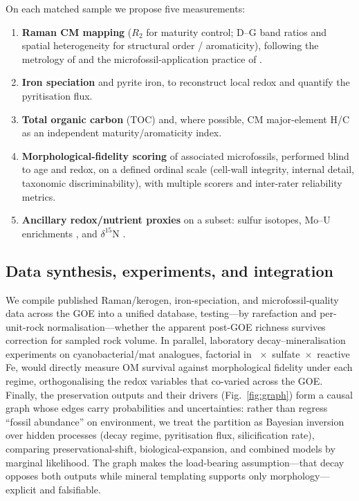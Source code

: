 \documentclass[11pt]{article}
\begin{document}
On each matched sample we propose five measurements:
\begin{enumerate}\itemsep0pt
\item \textbf{Raman CM mapping} ($R_2$ for maturity control; D--G band ratios and spatial
heterogeneity for structural order / aromaticity), following the metrology of \citet{Beyssac2002}
and the microfossil-application practice of \citet{Qu2019}.
\item \textbf{Iron speciation} \citep{Poulton2005} and pyrite iron, to reconstruct local redox and
quantify the pyritisation flux.
\item \textbf{Total organic carbon} (TOC) and, where possible, CM major-element H/C as an
independent maturity/aromaticity index.
\item \textbf{Morphological-fidelity scoring} of associated microfossils, performed blind to age
and redox, on a defined ordinal scale (cell-wall integrity, internal detail, taxonomic
discriminability), with multiple scorers and inter-rater reliability metrics.
\item \textbf{Ancillary redox/nutrient proxies} on a subset: sulfur isotopes, Mo--U enrichments
\citep{Scott2008}, and $\delta^{15}$N \citep{Garvin2009}.
\end{enumerate}

\subsection{Data synthesis, experiments, and integration}

We compile published Raman/kerogen, iron-speciation, and microfossil-quality data across the GOE
into a unified database, testing---by rarefaction and per-unit-rock normalisation---whether the
apparent post-GOE richness survives correction for sampled rock volume. In parallel, laboratory
decay--mineralisation experiments on cyanobacterial/mat analogues, factorial in
~$\times$~sulfate~$\times$~reactive Fe, would directly measure OM survival against
morphological fidelity under each regime, orthogonalising the redox variables that co-varied
across the GOE. Finally, the preservation outputs and their drivers (Fig.~\ref{fig:graph}) form a
causal graph whose edges carry probabilities and uncertainties: rather than regress ``fossil
abundance'' on environment, we treat the partition as Bayesian inversion over hidden processes
(decay regime, pyritisation flux, silicification rate), comparing preservational-shift,
biological-expansion, and combined models by marginal likelihood. The graph makes the load-bearing
assumption---that decay opposes both outputs while mineral templating supports only
morphology---explicit and falsifiable.
\end{document}
